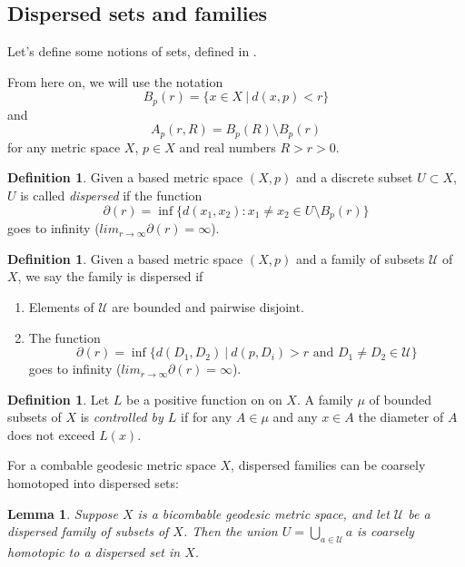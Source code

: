 \documentclass {amsart}
\newcommand {\U}        {\mathcal{U}}
\newtheorem   {lemma}       [theorem] {Lemma}
\theoremstyle {definition}
\newtheorem   {definition}  [theorem] {Definition}
\begin{document}
\subsection {Dispersed sets and families} 

Let's define some notions of  sets, defined in
\cite{bellAsymptoticDimensionBedlewo2005}.

From here on, we will use the notation
\[
    B_p(r) = \{ x \in X \ | \ d(x,p) < r \}
\]
and
\[
    A_p(r,R) = B_p(R) \setminus B_p(r)
\]
for any metric space \( X \), \( p \in X \) and real numbers \( R > r > 0 \).


\begin{definition}
    \label {def:dispersed-sets}
    Given a based metric space \( (X, p) \) and a discrete subset \( U \subset X
    \), \( U \) is called \emph{dispersed} if the function
    \[
        \partial (r) = \inf \{ d(x_1, x_2) : x_1 \neq x_2 \in U \setminus B _{p} (r) \}
    \]
  goes to infinity (\( lim _{r \to \infty} \partial (r) = \infty \)).
\end{definition}

\begin {definition}
    \label{def:dispersed-family}
    Given a based metric space \( (X,p) \) and a family of subsets \( \U \) of
    \( X \), we say the family is dispersed if
    \begin{enumerate}
      \item Elements of \( \U \) are bounded and pairwise disjoint.
      \item The function
        \[
          \partial (r) = \inf \{ d(D_1, D_2)
          \ | \ d(p, D_i) > r \text { and } D_1 \neq D_2 \in \U \}
        \]
        goes to infinity (\( lim _{r \to \infty} \partial (r) = \infty \)).
    \end{enumerate}
\end {definition}

\begin{definition}
    Let \( L \) be a positive function on on \( X \). A family \( \mu \) of
    bounded subsets of \( X \) is \emph{controlled by \( L \)} if for any \( A
    \in \mu \) and any \( x \in A \) the diameter of \( A \) does not exceed \(
    L(x) \).
\end{definition}

For a combable geodesic metric space \( X \), dispersed families can be coarsely
homotoped into dispersed sets:

\begin{lemma}
  \label{lem:dispersed-family-set}
  Suppose \( X \) is a bicombable geodesic metric space, and let \( \U \) be a
  dispersed family of subsets of \( X \). Then the union \( U = \bigcup _{a \in \U}
  a \) is coarsely homotopic to a dispersed set in \( X \).
\end{lemma}
\end{document}
